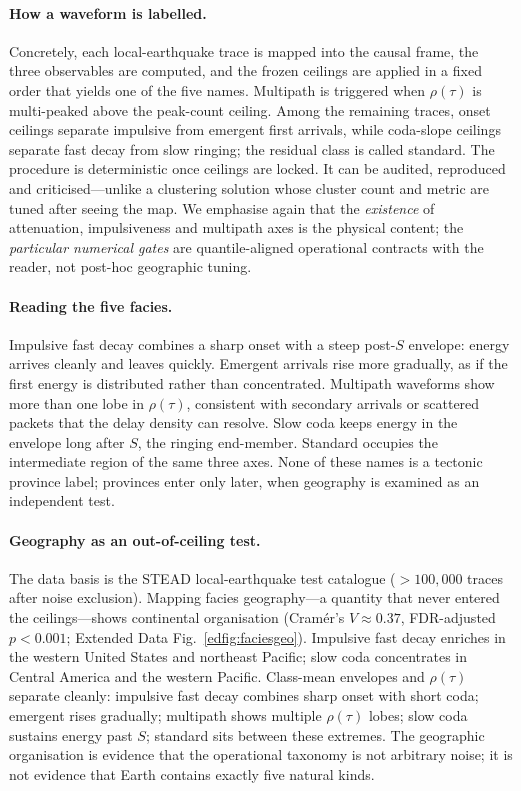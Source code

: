 \documentclass[twocolumn,10pt]{article}
\newcommand{\stead}{\textsc{STEAD}}
\begin{document}
\paragraph{How a waveform is labelled.}
Concretely, each local-earthquake trace is mapped into the causal frame, the
three observables are computed, and the frozen ceilings are applied in a fixed
order that yields one of the five names. Multipath is triggered when
\(\rho(\tau)\) is multi-peaked above the peak-count ceiling. Among the remaining
traces, onset ceilings separate impulsive from emergent first arrivals, while
coda-slope ceilings separate fast decay from slow ringing; the residual class is
called standard. The procedure is deterministic once ceilings are locked. It can
be audited, reproduced and criticised---unlike a clustering solution whose
cluster count and metric are tuned after seeing the map. We emphasise again that
the \emph{existence} of attenuation, impulsiveness and multipath axes is the
physical content; the \emph{particular numerical gates} are quantile-aligned
operational contracts with the reader, not post-hoc geographic tuning.

\paragraph{Reading the five facies.}
Impulsive fast decay combines a sharp onset with a steep post-\(S\) envelope:
energy arrives cleanly and leaves quickly. Emergent arrivals rise more
gradually, as if the first energy is distributed rather than concentrated.
Multipath waveforms show more than one lobe in \(\rho(\tau)\), consistent with
secondary arrivals or scattered packets that the delay density can resolve.
Slow coda keeps energy in the envelope long after \(S\), the ringing end-member.
Standard occupies the intermediate region of the same three axes. None of these
names is a tectonic province label; provinces enter only later, when geography
is examined as an independent test.

\paragraph{Geography as an out-of-ceiling test.}
The data basis is the \stead{} local-earthquake test catalogue
(\(>100{,}000\) traces after noise exclusion). Mapping facies geography---a
quantity that never entered the ceilings---shows continental organisation
(Cram\'er's \(V\approx0.37\), FDR-adjusted \(p<0.001\); Extended Data
Fig.~\ref{edfig:faciesgeo}). Impulsive fast decay enriches in the western United
States and northeast Pacific; slow coda concentrates in Central America and the
western Pacific. Class-mean envelopes and \(\rho(\tau)\) separate cleanly:
impulsive fast decay combines sharp onset with short coda; emergent rises
gradually; multipath shows multiple \(\rho(\tau)\) lobes; slow coda sustains
energy past \(S\); standard sits between these extremes. The geographic
organisation is evidence that the operational taxonomy is not arbitrary noise;
it is not evidence that Earth contains exactly five natural kinds.
\end{document}

